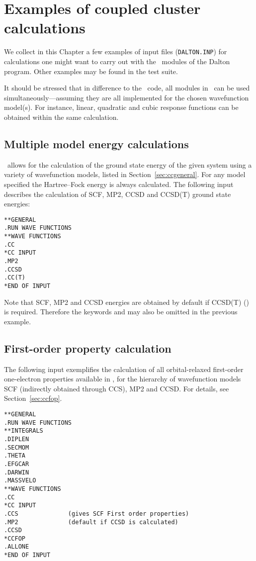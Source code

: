 \chapter{Examples of coupled cluster calculations}
\label{ch:ccexamples}

We collect in this Chapter a few examples of input files (\verb|DALTON.INP|) 
for calculations one might want to carry 
out with the \cc\ modules of the Dalton program.
Other examples may be found in the test suite. 

It should be stressed that in difference to the \resp \ code,
all modules in \cc \ can be used 
simultaneously---assuming they are all implemented
for the chosen wavefunction model(s).
For instance,  linear, quadratic and cubic response functions 
can be obtained within the same calculation.

\section{Multiple model energy calculations}
%
\cc\  allows for the calculation of the ground state energy
of the given system using a variety of wavefunction models, listed in 
Section~\ref{sec:ccgeneral}. 
For any model specified the Hartree--Fock energy is always calculated. 
The following input describes the calculation of SCF, MP2, CCSD and 
CCSD(T) ground state energies:
%
\begin{verbatim}
**GENERAL
.RUN WAVE FUNCTIONS
**WAVE FUNCTIONS
.CC
*CC INPUT
.MP2              
.CCSD
.CC(T)
*END OF INPUT
\end{verbatim}
Note that SCF, MP2 and CCSD energies are obtained by default if 
CCSD(T) () is required. Therefore the 
keywords  and 
may also be omitted in the previous example.

\section{First-order property calculation}

The following input exemplifies the calculation of all orbital-relaxed
first-order one-electron properties available in \cc, for the hierarchy of 
wavefunction models SCF (indirectly obtained through CCS), MP2 and CCSD.
For details, see Section~\ref{sec:ccfop}.
\begin{verbatim}
**GENERAL
.RUN WAVE FUNCTIONS
**INTEGRALS
.DIPLEN
.SECMOM
.THETA
.EFGCAR
.DARWIN
.MASSVELO
**WAVE FUNCTIONS
.CC
*CC INPUT
.CCS              (gives SCF First order properties)
.MP2              (default if CCSD is calculated)
.CCSD
*CCFOP
.ALLONE
*END OF INPUT
\end{verbatim}

